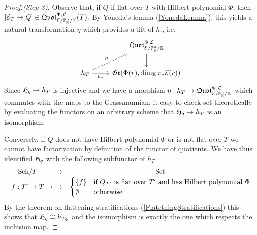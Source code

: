 \begin{proof}[Proof.(Step 3)]
Observe that, if $Q$ if flat over $T$ with Hilbert polynomial $\Phi$, then $[\mathcal{E}_T\to Q]\in \mathfrak{Quot}^{\Phi,\mathcal{L}}_{\mathcal{E}/\mathbb{P}^n_{\mathbb{K}}/\mathbb{K}}(T)$. By Yoneda's lemma (\ref{YonedaLemma}), this yields a natural transformation $\eta$ which provides a lift of $h_\tau$, i.e.
\[\begin{tikzcd}
	& {\quotf^{\Phi,\Lc}_{\Ec/\Pj^n_\K/\K}} \\
	{h_T} & {\gr(\Phi(r),\dim_\K\pi_\ast\Ec(r))}
	\arrow[from=1-2, to=2-2]
	\arrow["\eta", dashed, from=2-1, to=1-2]
	\arrow["{h_\tau}"', from=2-1, to=2-2]
\end{tikzcd}\]
Since $\mathfrak{H}_q\to h_T$ is injective and we have a morphism $\eta:h_T\to \mathfrak{Quot}^{\Phi,\mathcal{L}}_{\mathcal{E}/\mathbb{P}^n_{\mathbb{K}}/\mathbb{K}}$ which commutes with the maps to the Grassmannian, it easy to check set-theoretically by evaluating the functors on an arbitrary scheme that $\mathfrak{H}_q\to h_T$ is an isomorphism. 

Conversely, if $Q$ does not have Hilbert polynomial $\Phi$ or is not flat over $T$ we cannot have factorization by definition of the functor of quotients. We have thus identified $\mathfrak{H}_q$ with the following subfunctor of $h_T$
\[\begin{array}{ccc} {{\mathrm{Sch}}/{T}} & \longrightarrow & {\mathrm{Set}}\\ {f:T'\to T} & \longmapsto & {\begin{cases}
\left\{{f}\right\} &\text{if $Q_{T'}$ is flat over $T'$ and has Hilbert polynomial $\Phi$}
\\
\emptyset &\text{otherwise}
\end{cases}} \end{array}\]
By the theorem on flattening stratifications (\ref{FlatetningStratifications}) this shows that $\mathfrak{H}_q\cong h_{T_\Phi}$ and the isomorphism is exactly the one which respects the inclusion map.
\end{proof}